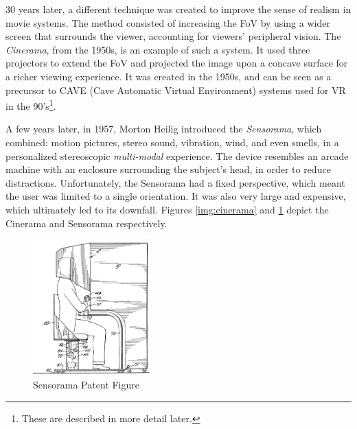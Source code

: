 30 years later, a different technique was created to improve the sense of realism in movie systems. The method consisted of increasing the FoV by using a wider screen that surrounds the viewer, accounting for viewers' peripheral vision. The \textit{Cinerama}, from the 1950s, is an example of such a system. It used three projectors to extend the FoV and projected the image upon a concave surface for a richer viewing experience. It was created in the 1950s, and can be seen as a precursor to CAVE (Cave Automatic Virtual Environment) systems used for VR in the 90's\footnote{These are described in more detail later.}.

A few years later, in 1957, Morton Heilig introduced the \textit{Sensorama}, which combined: motion pictures, stereo sound, vibration, wind, and even smells, in a personalized stereoscopic \textit{multi-modal} experience. The device resembles an arcade machine with an enclosure surrounding the subject's head, in order to reduce distractions. Unfortunately, the Sensorama had a fixed perspective, which meant the user was limited to a single orientation. It was also very large and expensive, which ultimately led to its downfall. Figures \ref{img:cinerama} and \ref{img:sensorama} depict the Cinerama and Sensorama respectively.

\begin{figure}[ht!]%
\centering
\includegraphics[width=0.4\textwidth]{img/sensorama.png} 
\caption{Sensorama Patent Figure \cite{FileSens36online}}
\label{img:sensorama}
\end{figure}

